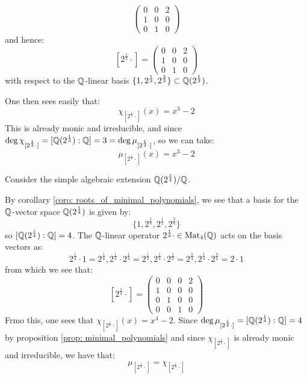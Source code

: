 \begin{example}
$$                    \begin{pmatrix}
                        0 & 0 & 2
                        \\
                        1 & 0 & 0
                        \\
                        0 & 1 & 0
                    \end{pmatrix}
                $$
            and hence:
                $$
                    [2^{\frac13} \cdot] =
                    \begin{pmatrix}
                        0 & 0 & 2
                        \\
                        1 & 0 & 0
                        \\
                        0 & 1 & 0
                    \end{pmatrix}
                $$
            with respect to the $\mathbb{Q}$-linear basis $\{1, 2^{\frac13}, 2^{\frac23}\} \subset \mathbb{Q}(2^{\frac13})$.

            One then sees easily that:
                $$\chi_{[2^{\frac13} \cdot]}(x) = x^3 - 2$$
            This is already monic and irreducible, and since $\deg \chi_{[2^{\frac13} \cdot]} = [\mathbb{Q}(2^{\frac13}) : \mathbb{Q}] = 3 = \deg \mu_{[2^{\frac13} \cdot]}$, so we can take:
                $$\mu_{[2^{\frac13} \cdot]}(x) = x^3 - 2$$
        \end{example}
        \begin{example}
            Consider the simple algebraic extension $\mathbb{Q}(2^{\frac14})/\mathbb{Q}$.

            By corollary \ref{coro: roots_of_minimal_polynomials}, we see that a basis for the $\mathbb{Q}$-vector space $\mathbb{Q}(2^{\frac14})$ is given by:
                $$\{1, 2^{\frac14}, 2^{\frac12}, 2^{\frac34}\}$$
            so $[\mathbb{Q}(2^{\frac14}) : \mathbb{Q}] = 4$. The $\mathbb{Q}$-linear operator $2^{\frac14} \cdot \in \mathrm{Mat}_4(\mathbb{Q})$ acts on the basis vectors as:
                $$2^{\frac14} \cdot 1 = 2^{\frac14}, 2^{\frac14} \cdot 2^{\frac14} = 2^{\frac12}, 2^{\frac14} \cdot 2^{\frac12} = 2^{\frac34}, 2^{\frac14} \cdot 2^{\frac34} = 2 \cdot 1$$
            from which we see that:
                $$
                    [2^{\frac14} \cdot] =
                    \begin{pmatrix}
                        0 & 0 & 0 & 2
                        \\
                        1 & 0 & 0 & 0
                        \\
                        0 & 1 & 0 & 0
                        \\
                        0 & 0 & 1 & 0
                    \end{pmatrix}
                $$
            Frmo this, one sees that $\chi_{[2^{\frac14} \cdot]}(x) = x^4 - 2$. Since $\deg \mu_{[2^{\frac14} \cdot]} = [\mathbb{Q}(2^{\frac14}) : \mathbb{Q}] = 4$ by proposition \ref{prop: minimal_polynomials} and since $\chi_{[2^{\frac14} \cdot]}$ is already monic and irreducible, we have that:
                $$\mu_{[2^{\frac14} \cdot]} = \chi_{[2^{\frac14} \cdot]}$$
        \end{example}

